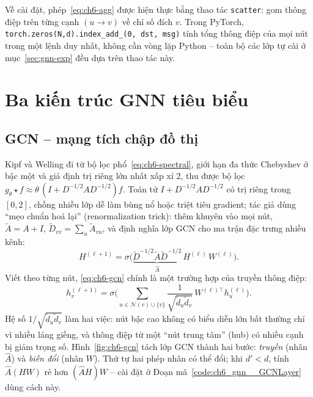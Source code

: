 Về cài đặt, phép~\eqref{eq:ch6-agg} được hiện thực bằng thao tác \texttt{scatter}: gom thông điệp trên từng cạnh
$(u\to v)$ về chỉ số đích $v$. Trong PyTorch, \texttt{torch.zeros(N,d).index\_add\_(0, dst, msg)} tính tổng thông điệp
của mọi nút trong một lệnh duy nhất, không cần vòng lặp Python -- toàn bộ các lớp tự cài ở mục~\ref{sec:gnn-exp} đều
dựa trên thao tác này.

\section{Ba kiến trúc GNN tiêu biểu}
\label{sec:gnn-arch}

\subsection{GCN -- mạng tích chập đồ thị}
\label{sec:gnn-gcn}

Kipf và Welling \cite{ch6:kipf2017} đi từ bộ lọc phổ~\eqref{eq:ch6-spectral}, giới hạn đa thức Chebyshev ở bậc một và
giả định trị riêng lớn nhất xấp xỉ 2, thu được bộ lọc $g_\theta\star f\approx\theta\,(I+D^{-1/2}AD^{-1/2})f$. Toán tử
$I+D^{-1/2}AD^{-1/2}$ có trị riêng trong $[0,2]$, chồng nhiều lớp dễ làm bùng nổ hoặc triệt tiêu gradient; tác giả dùng
``mẹo chuẩn hoá lại'' (renormalization trick): thêm khuyên vào mọi nút, $\tilde A=A+I$, $\tilde D_{vv}=\sum_u\tilde A_{vu}$,
và định nghĩa lớp GCN cho ma trận đặc trưng nhiều kênh:
\begin{equation}
  H^{(\ell+1)}=\sigma\!\Big(\underbrace{\tilde D^{-1/2}\tilde A\tilde D^{-1/2}}_{\hat A}\,H^{(\ell)}\,W^{(\ell)}\Big).
  \label{eq:ch6-gcn}
\end{equation}
Viết theo từng nút, \eqref{eq:ch6-gcn} chính là một trường hợp của truyền thông điệp:
\begin{equation}
  h_v^{(\ell+1)}=\sigma\Big(\sum_{u\in\mathcal N(v)\cup\{v\}}\frac{1}{\sqrt{\tilde d_u\tilde d_v}}\,W^{(\ell)\top}h_u^{(\ell)}\Big).
\end{equation}
Hệ số $1/\sqrt{\tilde d_u\tilde d_v}$ làm hai việc: nút bậc cao không có biểu diễn lớn bất thường chỉ vì nhiều láng
giềng, và thông điệp từ một ``nút trung tâm'' (hub) có nhiều cạnh bị giảm trọng số. Hình~\ref{fig:ch6-gcn} tách lớp GCN
thành hai bước: \emph{truyền} (nhân $\hat A$) và \emph{biến đổi} (nhân $W$). Thứ tự hai phép nhân có thể đổi; khi
$d'<d$, tính $\hat A(HW)$ rẻ hơn $(\hat AH)W$ -- cài đặt ở Đoạn mã~\ref{code:ch6_gnn__GCNLayer} dùng cách này.

